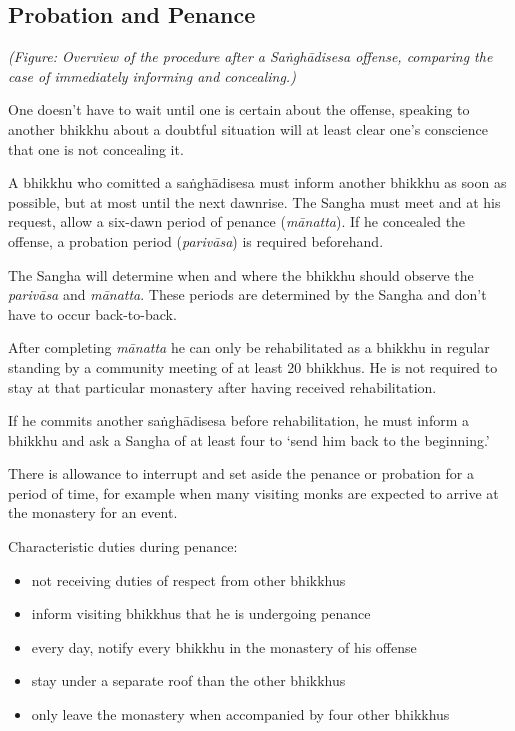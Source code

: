 \subsection{Probation and Penance}

\enlargethispage*{4\baselineskip}
\par
{}
\par
\clearpage

\emph{(Figure: Overview of the procedure after a Saṅghādisesa offense,
comparing the case of immediately informing and concealing.)}

One doesn't have to wait until one is certain about the offense,
speaking to another bhikkhu about a doubtful situation will at least
clear one's conscience that one is not concealing it.

A bhikkhu who comitted a saṅghādisesa must inform another bhikkhu as
soon as possible, but at most until the next dawnrise. The Sangha must
meet and at his request, allow a six-dawn period of penance
(\emph{mānatta}). If he concealed the offense, a probation period
(\emph{parivāsa}) is required beforehand.

The Sangha will determine when and where the bhikkhu should observe the
\emph{parivāsa} and \emph{mānatta}. These periods are determined by the
Sangha and don't have to occur back-to-back.

After completing \emph{mānatta} he can only be rehabilitated as a
bhikkhu in regular standing by a community meeting of at least 20
bhikkhus. He is not required to stay at that particular monastery after
having received rehabilitation.

If he commits another saṅghādisesa before rehabilitation, he must inform
a bhikkhu and ask a Sangha of at least four to `send him back to the
beginning.'

There is allowance to interrupt and set aside the penance or probation
for a period of time, for example when many visiting monks are expected
to arrive at the monastery for an event.

Characteristic duties during penance:

\begin{itemize}
\tightlist
\item
  not receiving duties of respect from other bhikkhus
\item
  inform visiting bhikkhus that he is undergoing penance
\item
  every day, notify every bhikkhu in the monastery of his offense
\item
  stay under a separate roof than the other bhikkhus
\item
  only leave the monastery when accompanied by four other bhikkhus
\end{itemize}


